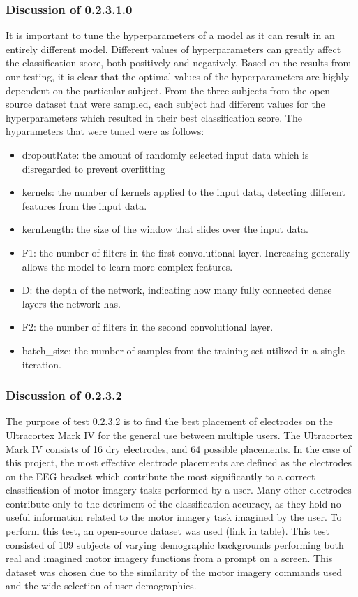 \documentclass[conference]{IEEEtran}
\begin{document}
    \subsubsection{Discussion of 0.2.3.1.0}
    It is important to tune the hyperparameters of a model as it can result in an entirely different model. Different values of hyperparameters can greatly affect the classification score, both positively and negatively. Based on the results from our testing, it is clear that the optimal values of the hyperparameters are highly dependent on the particular subject. From the three subjects from the open source dataset that were sampled, each subject had different values for the hyperparameters which resulted in their best classification score. The hyparameters that were tuned were as follows: 
    \begin{itemize}
        \item dropoutRate: the amount of randomly selected input data which is disregarded to prevent overfitting
        \item kernels: the number of kernels applied to the input data, detecting different features from the input data. 
        \item kernLength: the size of the window that slides over the input data. 
        \item F1: the number of filters in the first convolutional layer. Increasing generally allows the model to learn more complex features. 
        \item D: the depth of the network, indicating how many fully connected dense layers the network has. 
        \item F2: the number of filters in the second convolutional layer. 
        \item batch\_size: the number of samples from the training set utilized in a single iteration. 

    \end{itemize}
    
    \subsubsection{Discussion of 0.2.3.2}
    The purpose of test 0.2.3.2 is to find the best placement of electrodes on the Ultracortex Mark IV for the general use between multiple users. The Ultracortex Mark IV consists of 16 dry electrodes, and 64 possible placements. In the case of this project, the most effective electrode placements are defined as the electrodes on the EEG headset which contribute the most significantly to a correct classification of motor imagery tasks performed by a user. Many other electrodes contribute only to the detriment of the classification accuracy, as they hold no useful information related to the motor imagery task imagined by the user. To perform this test, an open-source dataset was used (link in table). This test consisted of 109 subjects of varying demographic backgrounds performing both real and imagined motor imagery functions from a prompt on a screen. This dataset was chosen due to the similarity of the motor imagery commands used and the wide selection of user demographics.  
\end{document}
